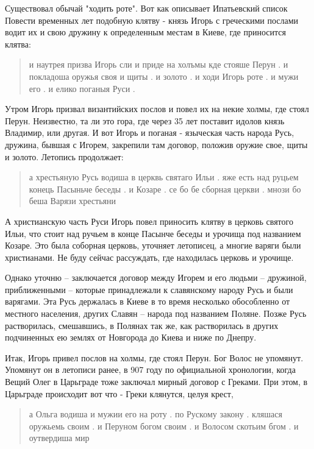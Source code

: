 \documentclass[a5paper,11pt,openany]{article}
\begin{document}
Существовал обычай "ходить роте". Вот как описывает Ипатьевский список Повести временных лет подобную клятву - князь Игорь с греческими послами водит их и свою дружину к определенным местам в Киеве, где приносится клятва:

\begin{quotation}
\noindent и наутрея призва Игорь сли и приде на холъмы кде стояше Перун . и покладоша
оружья своя и щиты . и золото . и ходи Игорь роте . и мужи его . и елико поганыя Руси .
\end{quotation} 

Утром Игорь призвал византийских послов и повел их на некие холмы, где стоял Перун. Неизвестно, та ли это гора, где через 35 лет поставит идолов князь Владимир, или другая. И вот Игорь и поганая - языческая часть народа Русь, дружина, бывшая с Игорем, закрепили там договор, положив оружие свое, щиты и золото. 
Летопись продолжает:

\begin{quotation}
\noindent а хрестьяную Русь водиша в церквь святаго Ильи . яже есть над руцьем конець Пасыньче  беседы . и Козаре . се бо бе сборная церкви . мнози бо беша Варязи хрестьяни 
\end{quotation}

А христианскую часть Руси Игорь повел приносить клятву в церковь святого Ильи, что стоит над ручьем в конце Пасынче беседы и урочища под названием Козаре. Это была соборная церковь, уточняет летописец, а многие варяги были христианами. Не буду сейчас рассуждать, где находилась церковь и урочище.

Однако уточню – заключается договор между Игорем и его людьми – дружиной, приближенными – которые принадлежали к славянскому народу Русь и были варягами. Эта Русь держалась в Киеве в то время несколько обособленно от местного населения, других Славян – народа под названием Поляне. Позже Русь растворилась, смешавшись, в Полянах так же, как растворилась в других подчиненных ею землях от Новгорода до Киева и ниже по Днепру.


    Итак, Игорь привел послов на холмы, где стоял Перун. Бог Волос не упомянут. Упомянут он в летописи ранее, в 907 году по официальной хронологии, когда Вещий Олег в Царьграде тоже заключал мирный договор с Греками. При этом, в Царьграде происходит вот что - Греки клянутся, целуя крест, 

\begin{quotation}
\noindent а Ольга водиша и мужии его на роту . по Рускому закону . кляшася оружьемь своим . и Перуном богом своим . и Волосом скотьим бгом . и оутвердиша мир
\end{quotation}
\end{document}
